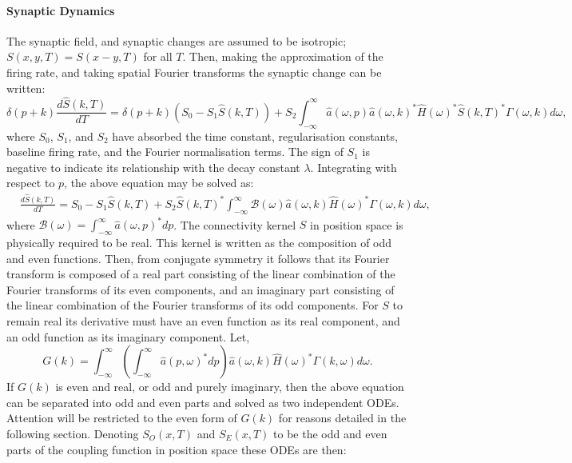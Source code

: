 \paragraph{Synaptic Dynamics}
The synaptic field, and synaptic changes are assumed to be isotropic; $S(x,y,T) = S(x-y,T)$ for all $T$. Then, making the approximation of the firing rate, and taking spatial Fourier transforms the synaptic change can be written:
\begin{equation}
	\delta(p+k)\frac{d\hat{S}(k,T)}{dT} = \delta(p+k)(S_0 - S_1 \hat{S}(k,T)) +  S_2\int_{-\infty}^{\infty}  \hat{a}(\omega,p)\hat{a}(\omega,k)^* \hat{H}(\omega)^* \hat{S}(k,T)^*\Gamma(\omega,k)  d\omega ,
\end{equation} 
where $S_0$, $S_1$, and $S_2$ have absorbed the time constant, regularisation constants, baseline firing rate, and the Fourier normalisation terms. The sign of $S_1$ is negative to indicate its relationship with the decay constant $\lambda$. Integrating with respect to $p$, the above equation may be solved as:
\begin{align}
	&\frac{d\hat{S}(k,T)}{dT} = S_0 - S_1\hat{S}(k,T) + S_2\hat{S}(k,T)^*\int_{-\infty}^{\infty}\mathcal{B}(\omega)\hat{a}(\omega,k) \hat{H}(\omega)^* \Gamma(\omega,k) d\omega,
\end{align}
where $\mathcal{B}(\omega) =  \int_{-\infty}^{\infty} \hat{a}(\omega,p)^*dp$. The connectivity kernel $S$ in position space is physically required to be real. This kernel is written as the composition of odd and even functions. Then, from conjugate symmetry it follows that its Fourier transform is composed of a real part consisting of the linear combination of the Fourier transforms of its even components, and an imaginary part consisting of the linear combination of the Fourier transforms of its odd components. For $S$ to remain real its derivative must have an even function as its real component, and an odd function as its imaginary component. Let,  
\begin{equation} 
	G(k)= \int_{-\infty}^{\infty} \left(\int_{-\infty}^{\infty}  \hat{a}(p,\omega)^*dp\right)\hat{a}(\omega,k) \hat{H}(\omega)^* \Gamma(k,\omega) d\omega.
\end{equation}
If $G(k)$ is even and real, or odd and purely imaginary, then the above equation can be separated into odd and even parts and solved as two independent ODEs. Attention will be restricted to the even form of $G(k)$ for reasons detailed in the following section. Denoting $S_{O}(x,T)$ and $S_E(x,T)$ to be the odd and even parts of the coupling function in position space these ODEs are then: 
